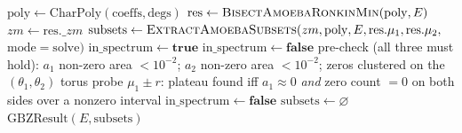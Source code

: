 \begin{algorithm}
\caption{\textsc{AmoebaCollectGBZSubsets}$(\mathrm{coeffs},\mathrm{degs},E)$ —
top-level amoeba entry point with the two-stage zero-plateau reclassification.}
\label{alg:amoeba-collect}
\begin{algorithmic}[1]
\State $\mathrm{poly}\gets\mathrm{CharPoly}(\mathrm{coeffs},\mathrm{degs})$
\State $\mathrm{res}\gets\textsc{BisectAmoebaRonkinMin}(\mathrm{poly},E)$
\State $zm\gets\mathrm{res}.\_zm$ 
\State $\mathrm{subsets}\gets\textsc{ExtractAmoebaSubsets}(zm,\mathrm{poly},E,\mathrm{res}.\mu_1,\mathrm{res}.\mu_2,$
\State \hspace{7.7em} $\mathrm{mode}{=}\mathrm{solve})$
\State $\mathrm{in\_spectrum}\gets\mathbf{true}$
  \State $\mathrm{in\_spectrum}\gets\mathbf{false}$
  \State pre-check (all three must hold): $a_1$ non-zero area $<10^{-2}$; $a_2$ non-zero area $<10^{-2}$;
  \State \hspace{4.4em} zeros clustered on the $(\theta_1,\theta_2)$ torus
    \State probe $\mu_1\pm r$: plateau found iff $a_1\approx0$ \emph{and} zero count $=0$ on both sides over a nonzero interval
     \State $\mathrm{in\_spectrum}\gets\mathbf{false}$ \EndIf
  \EndIf
\EndIf
{} \State $\mathrm{subsets}\gets\varnothing$ \EndIf
\State \Return $\mathrm{GBZResult}(E,\mathrm{subsets})$ 
\end{algorithmic}
\end{algorithm}

